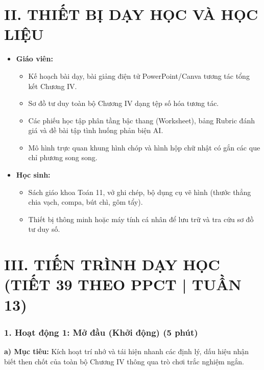 \documentclass[12pt, a4paper]{article}
\begin{document}
\section*{II. THIẾT BỊ DẠY HỌC VÀ HỌC LIỆU}

\begin{itemize}[leftmargin=1.2cm]
    \item \textbf{Giáo viên:}
    \begin{itemize}[leftmargin=0.6cm]
        \item Kế hoạch bài dạy, bài giảng điện tử PowerPoint/Canva tương tác tổng kết Chương IV.
        \item Sơ đồ tư duy toàn bộ Chương IV dạng tệp số hóa tương tác.
        \item Các phiếu học tập phân tầng bậc thang (Worksheet), bảng Rubric đánh giá và đề bài tập tình huống phản biện AI.
        \item Mô hình trực quan khung hình chóp và hình hộp chữ nhật có gắn các que chỉ phương song song.
    \end{itemize}
    \item \textbf{Học sinh:}
    \begin{itemize}[leftmargin=0.6cm]
        \item Sách giáo khoa Toán 11, vở ghi chép, bộ dụng cụ vẽ hình (thước thẳng chia vạch, compa, bút chì, gôm tẩy).
        \item Thiết bị thông minh hoặc máy tính cá nhân để lưu trữ và tra cứu sơ đồ tư duy số.
    \end{itemize}
\end{itemize}

\section*{III. TIẾN TRÌNH DẠY HỌC (TIẾT 39 THEO PPCT | TUẦN 13)}

\subsubsection*{1. Hoạt động 1: Mở đầu (Khởi động) (5 phút)}

\noindent \textbf{a) Mục tiêu:}
Kích hoạt trí nhớ và tái hiện nhanh các định lý, dấu hiệu nhận biết then chốt của toàn bộ Chương IV thông qua trò chơi trắc nghiệm ngắn.
\end{document}
